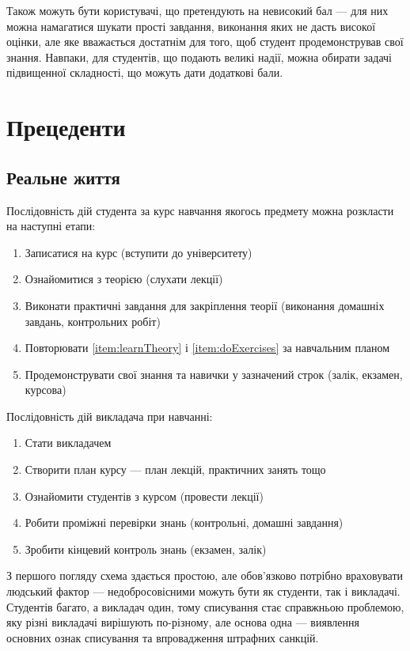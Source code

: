 Також можуть бути користувачі, що претендують на невисокий бал --- для них
можна намагатися шукати прості завдання, виконання яких не дасть високої
оцінки, але яке вважається достатнім для того, щоб студент продемонстрував свої
знання. Навпаки, для студентів, що подають великі надії, можна обирати
задачі підвищенної складності, що можуть дати додаткові бали.

\section{Прецеденти}

\subsection{Реальне життя}

Послідовність дій студента за курс навчання якогось предмету можна розкласти
на наступні етапи:
\begin{enumerate}
    \item
        Записатися на курс (вступити до університету)
    \item\label{item:learnTheory}
        Ознайомитися з теорією (слухати лекції)
    \item\label{item:doExercises}
        Виконати практичні завдання для закріплення теорії
        (виконання домашніх завдань, контрольних робіт)
    \item
        Повторювати \ref{item:learnTheory} і \ref{item:doExercises} за
        навчальним планом
    \item
        Продемонструвати свої знання та навички у зазначений строк
        (залік, екзамен, курсова)
\end{enumerate}

Послідовність дій викладача при навчанні:
\begin{enumerate}
    \item
        Стати викладачем
    \item
        Створити план курсу --- план лекцій, практичних занять тощо
    \item
        Ознайомити студентів з курсом (провести лекції)
    \item
        Робити проміжні перевірки знань (контрольні, домашні завдання)
    \item
        Зробити кінцевий контроль знань (екзамен, залік)
\end{enumerate}

З першого погляду схема здається простою, але обов’язково потрібно враховувати
людський фактор --- недобросовісними можуть бути як студенти, так і викладачі.
Студентів багато, а викладач один, тому списування стає справжньою проблемою,
яку різні викладачі вирішують по-різному, але основа одна --- виявлення
основних ознак списування та впровадження штрафних санкцій.

